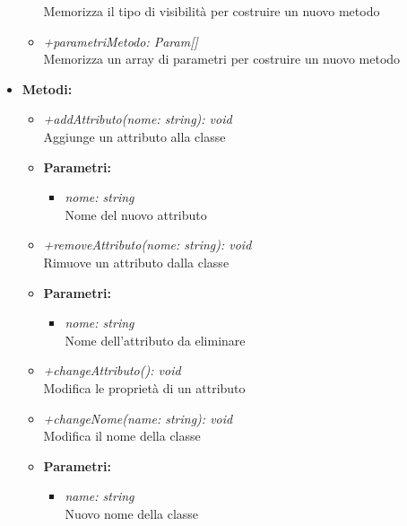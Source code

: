 \begin{itemize}
\begin{itemize}
            			Memorizza il tipo di visibilità per costruire un nuovo metodo
            			\item \emph{+parametriMetodo: Param[]}\\
            			Memorizza un array di parametri per costruire un nuovo metodo
          			\end{itemize}
          			\item \textbf{Metodi:}\\
          			\begin{itemize}
          				\item \emph{+addAttributo(nome: string): void}\\
            			Aggiunge un attributo alla classe
            			\item \textbf{Parametri:}\\
            				\begin{itemize}
            					\item \emph{nome: string}\\
            					Nome del nuovo attributo
            				\end{itemize}
            			\item \emph{+removeAttributo(nome: string): void}\\
            			Rimuove un attributo dalla classe
            			\item \textbf{Parametri:}\\
            				\begin{itemize}
            					\item \emph{nome: string}\\
            					Nome dell'attributo da eliminare
            				\end{itemize}
            			\item \emph{+changeAttributo(): void}\\
            			Modifica le proprietà di un attributo
            			\item \emph{+changeNome(name: string): void}\\
            			Modifica il nome della classe
            			\item \textbf{Parametri:}\\
            				\begin{itemize}
            					\item \emph{name: string}\\
            					Nuovo nome della classe
            				\end{itemize}

\end{itemize}
\end{itemize}
